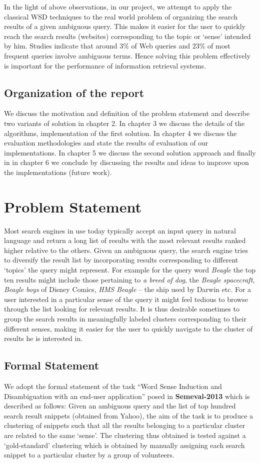\documentclass[a4paper,12pt]{report}
\begin{document}
In the light of above observations, in our project, we attempt to
apply the classical WSD techniques to the real world problem of
organizing the search results of a given ambiguous query. This makes
it easier for the user to quickly reach the search results (websites)
corresponding to the topic or `sense' intended by him. Studies
indicate that around $3\%$ of Web queries and $23\%$ of most frequent
queries involve ambiguous terms\cite{miller}. Hence solving this problem
effectively is important for the performance of information retrieval
systems.                   

\section{Organization of the report}
We discuss the motivation and definition of the problem statement and
describe two variants of solution in chapter 2. In chapter 3 we
discuss the details of the algorithms, implementation of the first
solution. In chapter 4 we discuss the evaluation methodologies and
state the results of evaluation of our implementations. In chapter 5
we discuss the second solution approach and finally in in chapter 6 we
conclude by discussing the results and ideas to improve upon the
implementations (future work).

\chapter{Problem Statement}
Most search engines in use today typically accept an input query in
natural language and return a long list of results with the most
relevant results ranked higher relative to the others. Given an
ambiguous query, the search engine tries to diversify the result list
by incorporating results corresponding to different `topics' the query
might represent. For example for the query word {\it Beagle} the top ten
results might include those pertaining to {\it a breed of dog}, the
{\it Beagle spacecraft}, {\it Beagle boys} of Disney Comics, {\it HMS
  Beagle} -- the ship used by Darwin etc. For a user interested in a
particular sense of the query it might feel tedious to browse through
the list looking for relevant results. It is thus desirable sometimes
to group the search results in meaningfully labeled clusters
corresponding to their different senses, making it easier for the user
to quickly navigate to the cluster of results he is interested in.

\section{Formal Statement}
We adopt the formal statement of the task ``Word Sense Induction and
Disambiguation with an end-user application'' posed in {\bf
  Semeval-2013} which is described as follows: Given an ambiguous
query and the list of top hundred search result snippets (obtained
from Yahoo), the aim of the task is to produce a clustering of
snippets such that all the results belonging to a particular cluster
are related to the same `sense'. The clustering thus obtained is
tested against a `gold-standard' clustering which is obtained by
manually assigning each search snippet to a particular cluster by a
group of volunteers. 
\end{document}
